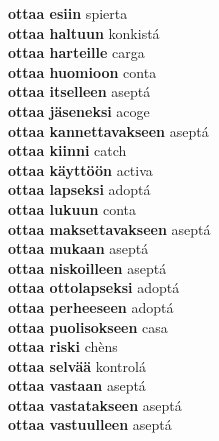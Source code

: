\textbf{ ottaa esiin  } spierta \\
\textbf{ ottaa haltuun  } konkistá \\
\textbf{ ottaa harteille  } carga \\
\textbf{ ottaa huomioon  } conta \\
\textbf{ ottaa itselleen  } aseptá \\
\textbf{ ottaa jäseneksi  } acoge \\
\textbf{ ottaa kannettavakseen  } aseptá \\
\textbf{ ottaa kiinni  } catch \\
\textbf{ ottaa käyttöön  } activa \\
\textbf{ ottaa lapseksi  } adoptá \\
\textbf{ ottaa lukuun  } conta \\
\textbf{ ottaa maksettavakseen  } aseptá \\
\textbf{ ottaa mukaan  } aseptá \\
\textbf{ ottaa niskoilleen  } aseptá \\
\textbf{ ottaa ottolapseksi  } adoptá \\
\textbf{ ottaa perheeseen  } adoptá \\
\textbf{ ottaa puolisokseen  } casa \\
\textbf{ ottaa riski  } chèns \\
\textbf{ ottaa selvää  } kontrolá \\
\textbf{ ottaa vastaan  } aseptá \\
\textbf{ ottaa vastatakseen  } aseptá \\
\textbf{ ottaa vastuulleen  } aseptá \\
